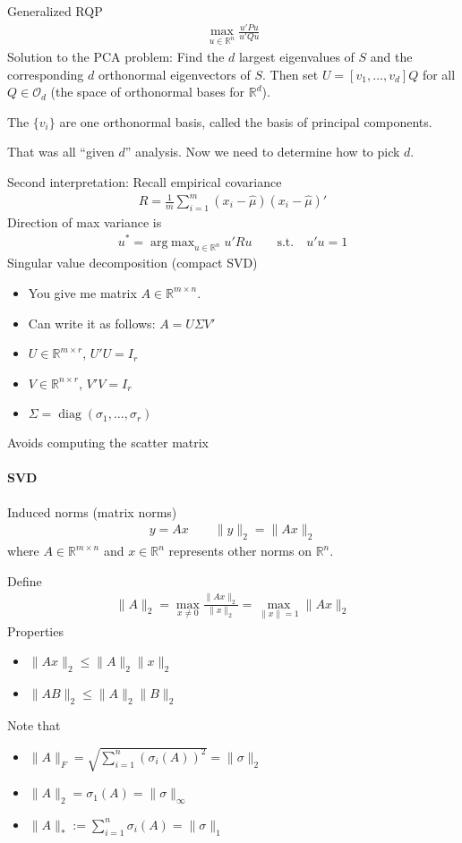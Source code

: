 \documentclass[12pt]{book}
\numberwithin{equation}{section} %
\theoremstyle{plain}
\theoremstyle{definition}
\theoremstyle{remark}
\newcommand{\diag}{\operatorname{diag}}
\newcommand{\calO}{\mathcal{O}}
\newcommand{\R}{\mathbb{R}}
\newcommand{\Rn}{\mathbb{R}^n}
\DeclareMathOperator*{\argmax}{arg\;max}
\newcommand{\sumin}{\sum^n_{i=1}}
\begin{document}
Generalized RQP
\begin{align*}
  \max_{u\in\R^{n}} \frac{u'Pu}{u'Qu}
\end{align*}
Solution to the PCA problem:
Find the $d$ largest eigenvalues of $S$ and the corresponding $d$
orthonormal eigenvectors of $S$.
Then set $U=[v_1,\ldots,v_d]Q$ for all $Q\in \calO_d$ (the space of
orthonormal bases for $\R^d$).

The $\{v_i\}$ are one orthonormal basis, called the basis of principal
components.

That was all ``given $d$'' analysis.
Now we need to determine how to pick $d$.

Second interpretation:
Recall empirical covariance
\begin{align*}
  R=
  \frac{1}{m}
  \sum_{i=1}^m (x_i-\hat{\mu})(x_i-\hat{\mu})'
\end{align*}
Direction of max variance is
\begin{align*}
  u^* = \argmax_{u\in\Rn} u'Ru
  \qquad\text{s.t.}\quad
  u'u=1
\end{align*}
Singular value decomposition (compact SVD)
\begin{itemize}
  \item You give me matrix $A\in\R^{m\times n}$.
  \item Can write it as follows: $A=U\Sigma V'$
  \item $U\in \R^{m\times r}$, $U'U=I_r$
  \item $V\in\R^{n\times r}$, $V'V=I_r$
  \item $\Sigma=\diag(\sigma_1,\ldots,\sigma_r)$
\end{itemize}
Avoids computing the scatter matrix


\paragraph{SVD}
Induced norms (matrix norms)
\begin{align*}
  y=Ax
  \qquad
  \lVert y\rVert_2
  =
  \lVert Ax\rVert_2
\end{align*}
where $A\in\R^{m\times n}$ and $x\in\Rn$ represents other norms on
$\Rn$.

Define
\begin{align*}
  \lVert A\rVert_2
  =
  \max_{x\neq 0}
  \frac{\lVert Ax\rVert_2}{\lVert x\rVert_2}
  =
  \max_{\lVert x\rVert=1}
  \lVert Ax\rVert_2
\end{align*}
Properties
\begin{itemize}
  \item $\lVert Ax\rVert_2\leq \lVert A\rVert_2\lVert x\rVert_2$
  \item $\lVert AB\rVert_2\leq \lVert A\rVert_2\lVert B\rVert_2$
\end{itemize}
Note that
\begin{itemize}
  \item
    $\lVert A\rVert_F=\sqrt{\sumin (\sigma_i(A))^2}=\lVert
    \sigma\rVert_2$
  \item $\lVert A\rVert_2=\sigma_1(A) = \lVert\sigma\rVert_\infty$
  \item $\lVert A\rVert_*:=\sumin \sigma_i(A)=\lVert\sigma\rVert_1$
\end{itemize}
\end{document}
